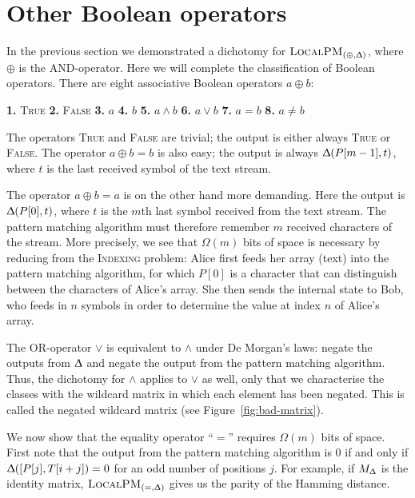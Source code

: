 \documentclass{article}
\renewcommand{\Delta}{\Updelta}
\newcommand{\TRUE}{\textsc{True}\xspace}
\newcommand{\FALSE}{\textsc{False}\xspace}
\newcommand{\indexing}{\textsc{Indexing}\xspace}
\newcommand{\local}{\ensuremath{\textsc{LocalPM}}}
\theoremstyle{plain}
\theoremstyle{definition}
\begin{document}
\section{Other Boolean operators} \label{sec:otherbool}

In the previous section we demonstrated a dichotomy for $\local_{(\oplus,\Delta)}$, where $\oplus$ is the AND-operator. Here we will complete the classification of Boolean operators. There are eight associative Boolean operators $a\oplus b$:

\medskip
\noindent
\hfill
\textbf{1.} \TRUE \hfill
\textbf{2.} \FALSE \hfill
\textbf{3.} $a$ \hfill
\textbf{4.} $b$ \hfill
\textbf{5.} $a\wedge b$ \hfill
\textbf{6.} $a\vee b$ \hfill
\textbf{7.} $a=b$ \hfill
\textbf{8.} $a\neq b$ \hfill

\medskip
The operators \TRUE and \FALSE are trivial; the output is either always \TRUE or \FALSE. The operator $a\oplus b=b$ is also easy; the output is always $\Delta(P[m-1],t)$, where $t$ is the last received symbol of the text stream.

The operator $a\oplus b=a$ is on the other hand more demanding. Here the output is $\Delta(P[0],t)$, where $t$ is the $m$th last symbol received from the text stream. The pattern matching algorithm must therefore remember $m$ received characters of the stream. More precisely, we see that $\Omega(m)$ bits of space is necessary by reducing from the \indexing problem: Alice first feeds her array (text) into the pattern matching algorithm, for which $P[0]$ is a character that can distinguish between the characters of Alice's array. She then sends the internal state to Bob, who feeds in $n$ symbols in order to determine the value at index $n$ of Alice's array.

The OR-operator $\vee$ is equivalent to $\wedge$ under De Morgan's laws: negate the outputs from $\Delta$ and negate the output from the pattern matching algorithm. Thus, the dichotomy for $\wedge$ applies to $\vee$ as well, only that we characterise the classes with the wildcard matrix in which each element has been negated. This is called the negated wildcard matrix (see Figure~\ref{fig:bad-matrix}).

We now show that the equality operator ``$=$'' requires $\Omega(m)$ bits of space. First note that the output from the pattern matching algorithm is 0 if and only if $\Delta([P[j],T[i+j])=0$ for an odd number of positions $j$. For example, if $M_\Delta$ is the identity matrix, $\local_{(=,\Delta)}$ gives us the parity of the Hamming distance.
\end{document}
